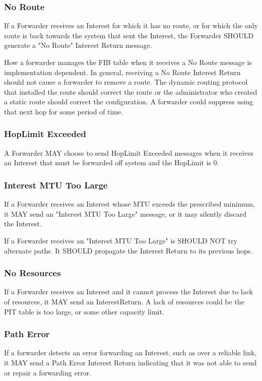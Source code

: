 \documentclass[12pt]{article}
\begin{document}
\subsubsection{No Route}
If a Forwarder receives an Interest for which it has no route, or for
which the only route is back towards the system that sent the
Interest, the Forwarder SHOULD generate a "No Route" Interest Return
message.

How a forwarder manages the FIB table when it receives a No Route
message is implementation dependent.  In general, receiving a No
Route Interest Return should not cause a forwarder to remove a route.
The dynamic routing protocol that installed the route should correct
the route or the administrator who created a static route should
correct the configuration.  A forwarder could suppress using that
next hop for some period of time.

\subsubsection{HopLimit Exceeded}
A Forwarder MAY choose to send HopLimit Exceeded messages when it
receives an Interest that must be forwarded off system and the
HopLimit is 0.

\subsubsection{Interest MTU Too Large}
If a Forwarder receives an Interest whose MTU exceeds the prescribed
minimum, it MAY send an "Interest MTU Too Large" message, or it may
silently discard the Interest.

If a Forwarder receives an "Interest MTU Too Large" is SHOULD NOT try
alternate paths. It SHOULD propagate the Interest Return to its
previous hops.

\subsubsection{No Resources}
If a Forwarder receives an Interest and it cannot process the
Interest due to lack of resources, it MAY send an InterestReturn. A
lack of resources could be the PIT table is too large, or some other
capacity limit.

\subsubsection{Path Error}
If a forwarder detects an error forwarding an Interest, such as over
a reliable link, it MAY send a Path Error Interest Return indicating
that it was not able to send or repair a forwarding error.
\end{document}
